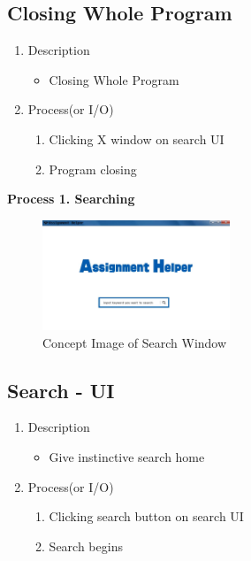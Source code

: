 \documentclass[conference]{IEEEtran}
\begin{document}
\textit{}

\subsection{Closing Whole Program}
\begin{enumerate}
  \item Description
  \begin{itemize}
    \item Closing Whole Program
  \end{itemize}
  \item Process(or I/O)
  \begin{enumerate}
    \item Clicking X window on search UI
    \item Program closing
  \end{enumerate}
\end{enumerate}
\textit{}


\textbf{Process 1. Searching}


\textit{}
\begin{figure}[h]
\centering
\includegraphics[width=0.5\textwidth]{./figures/UI_main.jpg}
\caption{Concept Image of Search Window}
\label{fig_concept_main}
\end{figure}


\subsection{Search - UI}
\begin{enumerate}
\item Description
\begin{itemize}
   \item Give instinctive search home
\end{itemize}
\item Process(or I/O)
  \begin{enumerate}
     \item Clicking search button on search UI
     \item Search begins
  \end{enumerate}
\end{enumerate}
\textit{}
\end{document}
